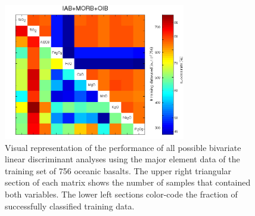\begin{figure}[htbp]
  \includegraphics[width=300]{figures/xPlotMajor2_linear_err.jpg}
\caption[Exhaustive exploration of all bivariate linear discriminant 
analyses using only major elements]{
Visual  representation of  the performance  of all  possible bivariate
linear  discriminant analyses  using  the major  element  data of  the
training  set of  756  oceanic basalts.   The  upper right  triangular
section of each matrix shows the number of samples that contained both
variables.   The  lower  left  sections  color-code  the  fraction  of
successfully classified training data.}
  \label{fig:major2lin}
\end{figure}

